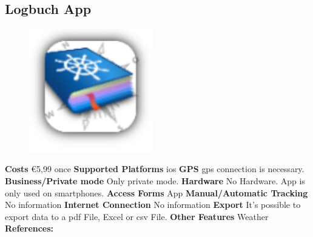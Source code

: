 \begin{singlespace}
\section{Logbuch App}
\begin{figure}
  \begin{center}
    \includegraphics[width=0.48\textwidth]{bilder/logbuchapp}
  \end{center}
\end{figure}
\textbf{Costs} \euro 5,99 once
\newline\newline
\textbf{Supported Platforms} \gls{ios}
\newline\newline
\textbf{GPS} \gls{gps} connection is necessary.
\newline\newline
\textbf{Business/Private mode} Only private mode.
\newline\newline
\textbf{Hardware} No Hardware. App is only used on smartphones.
\newline\newline
\textbf{Access Forms} App
\newline\newline
\textbf{Manual/Automatic Tracking} No information
\newline\newline
\textbf{Internet Connection} No information
\newline\newline
\textbf{Export} It’s possible to export data to a \gls{pdf} File, Excel or \gls{csv} File.
\newline\newline
\textbf{Other Features} Weather
\newline\newline
\textbf{References:} \cite{Logbuch_App}
\newpage


\end{singlespace}
